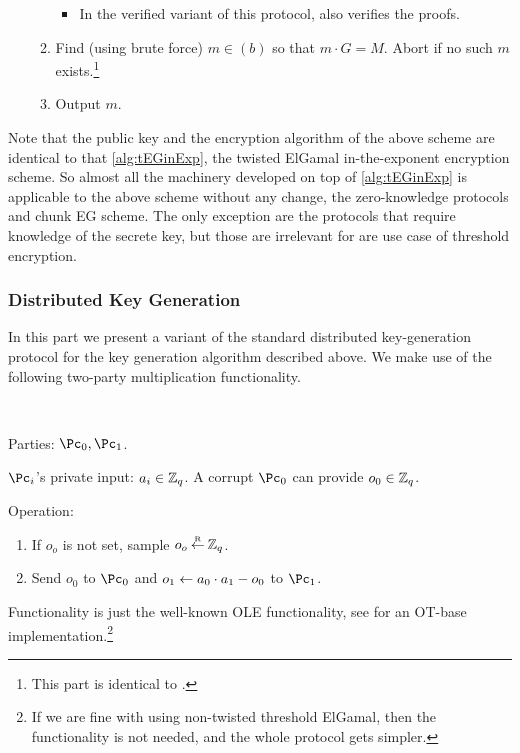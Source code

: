 \begin{algorithm}
\begin{enumerate}
\begin{enumerate}
			\begin{itemize}
				\item In the verified variant of this protocol, \Cc also verifies the proofs.
			\end{itemize}
			
			\item Find (using brute force) $m\in(b)$ so that $m\cdot G = M$. Abort if no such $m$ exists.\footnote{This part is identical to \EgDec.}
			
			\item Output $m$.
		\end{enumerate}
	\end{enumerate}
\end{algorithm}	

Note that the public key and the encryption algorithm of the above scheme are identical to that \cref{alg:tEGinExp}, the twisted ElGamal in-the-exponent encryption scheme. So almost all the machinery  developed on top of \cref{alg:tEGinExp} is applicable to the above scheme without any change, \ie the zero-knowledge protocols and chunk EG scheme. The only exception are the protocols that require knowledge of the secrete key, but those are irrelevant for are use case of   threshold encryption.

\subsubsection{Distributed Key Generation}
In this part we present a variant of the standard distributed key-generation  protocol for the key generation algorithm \tdKg described above.  We make use of the following two-party multiplication   functionality.

\begin{functionality}\label{func:Mult}~
\item[Parties:] $\Pc_0,\Pc_1$.
\item[$\Pc_i$'s private input:] $a_i \in {\mathbb Z}_q$. A corrupt $\Pc_0$ can provide $o_0 \in {\mathbb Z}_q$.

\item[Operation:] ~
\begin{enumerate}
	\item If $o_o$ is not set, sample $o_o \mathbin{\stackrel{\mbox{\tiny R}}{\leftarrow}} {\mathbb Z}_q$.
	
	\item Send $o_0$ to $\Pc_0$ and $o_1 \leftarrow a_0 \cdot a_1 - o_0$ to $\Pc_1$.
\end{enumerate}
 
\end{functionality}
Functionality \Mult is just the well-known OLE functionality, see \cite{HaitnerMRT22} for an OT-base  implementation.\footnote{If we are fine with  using non-twisted threshold ElGamal, then the \Mult functionality is not needed, and the whole protocol gets simpler.}

